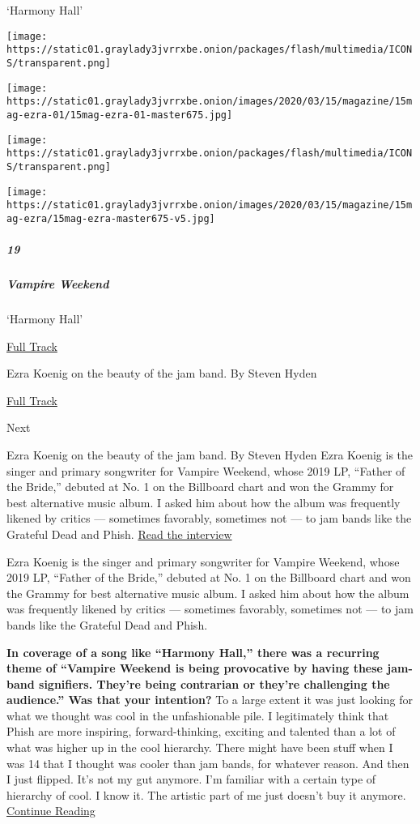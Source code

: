 `Harmony Hall'

\texttt{[image: https://static01.graylady3jvrrxbe.onion/packages/flash/multimedia/ICONS/transparent.png]}

\texttt{[image: https://static01.graylady3jvrrxbe.onion/images/2020/03/15/magazine/15mag-ezra-01/15mag-ezra-01-master675.jpg]}

\texttt{[image: https://static01.graylady3jvrrxbe.onion/packages/flash/multimedia/ICONS/transparent.png]}

\texttt{[image: https://static01.graylady3jvrrxbe.onion/images/2020/03/15/magazine/15mag-ezra/15mag-ezra-master675-v5.jpg]}

\hypertarget{19}{%
\subparagraph{19}\label{19}}

\hypertarget{vampire-weekend}{%
\subparagraph{Vampire Weekend}\label{vampire-weekend}}

`Harmony Hall'

\href{https://open.spotify.com/track/39exKIvycQDgs4T6uXdyu0?si=7Wg7njivRLKJrGsRAYT7fg}{
Full Track}

Ezra Koenig on the beauty of the jam band. By Steven Hyden

\href{https://open.spotify.com/track/39exKIvycQDgs4T6uXdyu0?si=7Wg7njivRLKJrGsRAYT7fg}{Full
Track }

Next

Ezra Koenig on the beauty of the jam band. By Steven Hyden Ezra Koenig
is the singer and primary songwriter for Vampire Weekend, whose 2019 LP,
``Father of the Bride,'' debuted at No. 1 on the Billboard chart and won
the Grammy for best alternative music album. I asked him about how the
album was frequently likened by critics --- sometimes favorably,
sometimes not --- to jam bands like the Grateful Dead and Phish.
\href{https://www.nytimes3xbfgragh.onion/interactive/2020/03/11/magazine/vampire-weekend-interview.html}{Read
the interview}

Ezra Koenig is the singer and primary songwriter for Vampire Weekend,
whose 2019 LP, ``Father of the Bride,'' debuted at No. 1 on the
Billboard chart and won the Grammy for best alternative music album. I
asked him about how the album was frequently likened by critics ---
sometimes favorably, sometimes not --- to jam bands like the Grateful
Dead and Phish.

\textbf{In coverage of a song like ``Harmony Hall,'' there was a
recurring theme of ``Vampire Weekend is being provocative by having
these jam-band signifiers. They're being contrarian or they're
challenging the audience.'' Was that your intention?} To a large extent
it was just looking for what we thought was cool in the unfashionable
pile. I legitimately think that Phish are more inspiring,
forward-thinking, exciting and talented than a lot of what was higher up
in the cool hierarchy. There might have been stuff when I was 14 that I
thought was cooler than jam bands, for whatever reason. And then I just
flipped. It's not my gut anymore. I'm familiar with a certain type of
hierarchy of cool. I know it. The artistic part of me just doesn't buy
it anymore.
\href{https://www.nytimes3xbfgragh.onion/interactive/2020/03/11/magazine/vampire-weekend-interview.html}{Continue
Reading}

